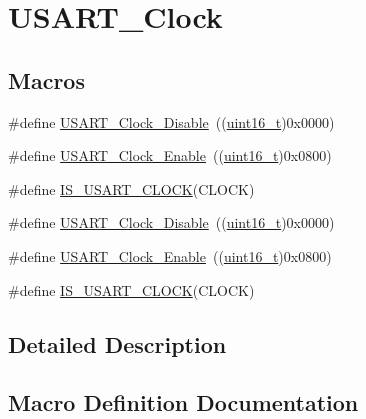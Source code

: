 \hypertarget{group___u_s_a_r_t___clock}{}\section{U\+S\+A\+R\+T\+\_\+\+Clock}
\label{group___u_s_a_r_t___clock}
\subsection*{Macros}
\begin{DoxyCompactItemize}
\item 
\#define \hyperlink{group___u_s_a_r_t___clock_ga56c12b81d19853c093e0a373d0c52fb5}{U\+S\+A\+R\+T\+\_\+\+Clock\+\_\+\+Disable}~((\hyperlink{_p_e___types_8h_a1f1825b69244eb3ad2c7165ddc99c956}{uint16\+\_\+t})0x0000)
\item 
\#define \hyperlink{group___u_s_a_r_t___clock_gacfe029e2ec4f49ddde031fd031654caa}{U\+S\+A\+R\+T\+\_\+\+Clock\+\_\+\+Enable}~((\hyperlink{_p_e___types_8h_a1f1825b69244eb3ad2c7165ddc99c956}{uint16\+\_\+t})0x0800)
\item 
\#define \hyperlink{group___u_s_a_r_t___clock_ga0f1e1ba37690b21b7338ed3b06614cf6}{I\+S\+\_\+\+U\+S\+A\+R\+T\+\_\+\+C\+L\+O\+CK}(C\+L\+O\+CK)
\item 
\#define \hyperlink{group___u_s_a_r_t___clock_ga56c12b81d19853c093e0a373d0c52fb5}{U\+S\+A\+R\+T\+\_\+\+Clock\+\_\+\+Disable}~((\hyperlink{_p_e___types_8h_a1f1825b69244eb3ad2c7165ddc99c956}{uint16\+\_\+t})0x0000)
\item 
\#define \hyperlink{group___u_s_a_r_t___clock_gacfe029e2ec4f49ddde031fd031654caa}{U\+S\+A\+R\+T\+\_\+\+Clock\+\_\+\+Enable}~((\hyperlink{_p_e___types_8h_a1f1825b69244eb3ad2c7165ddc99c956}{uint16\+\_\+t})0x0800)
\item 
\#define \hyperlink{group___u_s_a_r_t___clock_ga0f1e1ba37690b21b7338ed3b06614cf6}{I\+S\+\_\+\+U\+S\+A\+R\+T\+\_\+\+C\+L\+O\+CK}(C\+L\+O\+CK)
\end{DoxyCompactItemize}


\subsection{Detailed Description}


\subsection{Macro Definition Documentation}
